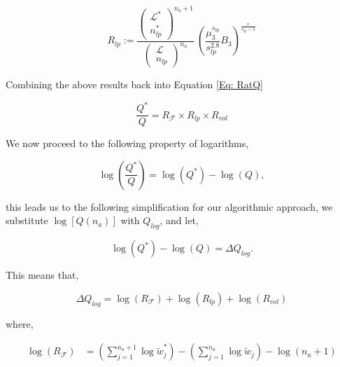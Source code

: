 \documentclass[12pt,letterpaper]{article}
\newcommand{\leng}{\mathcal{L}}
\newcommand{\lr}[1]{\left( #1 \right)}
\newcommand{\lrb}[1]{\left[ #1 \right]}
\newcommand{\fop}{\ensuremath{\mathcal{F}}}
\begin{document}
\begin{equation}
    R_{lp}:=
    \frac{
        \lr{
        \begin{array}{c}
             \leng^{*}\\
             n_{lp}^{*} 
        \end{array}
        }^{n_a+1}   
}{
        \lr{
        \begin{array}{c}
             \leng\\
             n_{lp}
        \end{array}
        }^{n_a}
}
~
\lr{
    \frac{
        \mu_3^{
            s_{lp}
        }
    }{
        s_{lp}^{2.8}
    }
    B_3
}
^{
    \frac{
        r
    }{
        s_{lp}-1
    }
}
\end{equation}


Combining the above results back into Equation \ref{Eq: RatQ}


\begin{equation}
    \frac{
        Q^{*}
    }{
        Q
    }
    =
    R_{\fop}
    \times
    R_{lp}
    \times
    R_{vol}
\label{finalflee}
\end{equation}

We now proceed to the following property of logarithms, 

\begin{equation}
    \log
    \lr{
    \frac{
            Q^{*}
        }{
            Q
        }
    }
    =
    \log(Q^{*})-\log(Q),
\end{equation}

this leads us to the following simplification for our algorithmic approach, we substitute $\log\lrb{Q(n_a)}$ with $Q_{log}$, and let,

\begin{equation}
\log(Q^{*})
-
\log(Q)
=
\Delta Q_{log}.
\label{eq.letdeltaq}
\end{equation}

This means that,

\begin{equation}
    \Delta Q_{log}    
    =
    \log\lr{
        R_{\fop}
    }
    +
    \log\lr{
        R_{lp}
    }
    +
    \log\lr{
        R_{vol}
    }
\end{equation}

where,

\begin{align}
    \log
    \lr{
    R_{\fop}
    }
    &=
    \lr{
        \displaystyle
        \sum_{j=1}^{n_a+1}\log\tilde{w}^{*}_j
    }
    -
    \lr{
        \displaystyle
        \sum_{j=1}^{n_a}\log
        \tilde{w}_j        
    }
    -
    \log
    \lr{
        n_a+1
    }
   \label{Eq: logRG}
\end{align}
\end{document}
